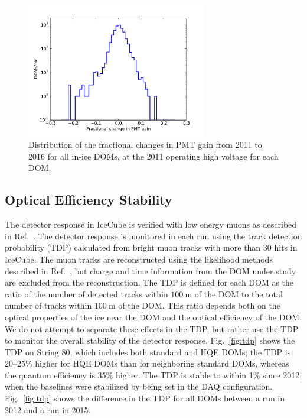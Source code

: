 \begin{figure}[!h]
 \centering
 \includegraphics[width=0.7\textwidth]{graphics/dom/reliability/pmt_gainshift.pdf}
 \caption{Distribution of the fractional changes in PMT gain from 2011 to 2016 for all in-ice
   DOMs, at the 2011 operating high voltage for each DOM.}
 \label{fig:pmt_gainshift}
\end{figure}

\subsection{\label{sec:optical_stability}Optical Efficiency Stability}

The detector response in IceCube is verified with low energy muons as
described in Ref.~\cite{IC3:ereco}. The detector response is monitored in each run using the track
detection probability (TDP) calculated from bright muon tracks
with more than 30 hits in IceCube. The muon 
tracks are reconstructed using the likelihood methods described in
Ref.~\cite{Ahrens:2003fg}, but charge and time information from the DOM under
study are excluded from the reconstruction. The TDP is
defined for each DOM as the ratio of the number of detected tracks
within $\SI{100}{\meter}$ of the DOM to the total number of tracks within $\SI{100}{\meter}$ of
the DOM. This ratio depends both on the optical properties of the ice
near the DOM and the optical efficiency of the DOM. We do not attempt
to separate
these effects in the TDP, but rather use the TDP to monitor the
overall stability of the detector response. Fig.~\ref{fig:tdp} shows the TDP on
String 80, which includes both standard and HQE DOMs; the TDP is
20--25\% higher for HQE DOMs than for neighboring standard
DOMs, whereas the quantum efficiency is 35\% higher. The TDP is stable to within 1\% since 2012, when the baselines
were stabilized by being set in the DAQ configuration. Fig.~\ref{fig:tdp} shows
the difference in the TDP for all DOMs between a run in 2012 and a run
in 2015.

